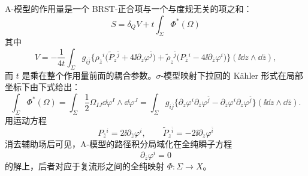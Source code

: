 A-模型的作用量是一个 BRST-正合项与一个与度规无关的项之和：
\begin{equation}
S=\delta_QV+t\int_\Sigma\Phi^*(\Omega) \tag{7.3}
\end{equation}
其中
\[
V=-\frac{1}{4t}\int_\Sigma g_{i\bar j}\Big\{\rho_{\bar z}{}^i\big(\tilde P_z{}^{\bar j}+4\ii\partial_z\varphi^{\bar j}\big)+\tilde\rho_z{}^{\bar j}\big(P_{\bar z}{}^i-4\ii\partial_{\bar z}\varphi^i\big)\Big\}(\ii\dd z\wedge\dd\bar z),
\]
而 $t$ 是乘在整个作用量前面的耦合参数。$\sigma$-模型映射下拉回的 Kähler 形式在局部坐标下由下式给出：
\begin{equation}
\int_\Sigma\Phi^*(\Omega)=\int_\Sigma\frac12\Omega_{IJ}\dd\varphi^I\wedge\dd\varphi^J=\int_\Sigma g_{i\bar j}\Big\{\partial_z\varphi^i\partial_{\bar z}\varphi^{\bar j}-\partial_{\bar z}\varphi^i\partial_z\varphi^{\bar j}\Big\}(\ii\dd z\wedge\dd\bar z). \tag{7.4}
\end{equation}
用运动方程
\[
P_{\bar z}{}^i=2\ii\partial_{\bar z}\varphi^i,\qquad \tilde P_z{}^{\bar i}=-2\ii\partial_z\varphi^{\bar i}
\]
消去辅助场后可见，A-模型的路径积分局域化在全纯瞬子方程
\[
\partial_{\bar z}\varphi^i=0
\]
的解上，后者对应于复流形之间的全纯映射 $\Phi:\Sigma\to X$。

